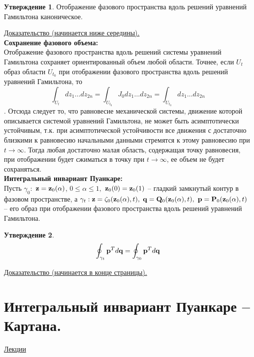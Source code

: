 \documentclass[specialist, subf, href, colorlinks=true, 12pt, times, mtpro, final]{disser}
\theoremstyle{definition}
\newtheorem{state}{Утверждение}[section]
\begin{document}
    \begin{state}
    	Отображение фазового пространства вдоль решений уравнений Гамильтона каноническое.
    \end{state}
    \hyperlink{lects.39}{Доказательство (начинается ниже середины).}\\

	\textbf{Сохранение фазового объема:}\\
	Отображение фазового пространства вдоль решений системы уравнений Гамильтона сохраняет ориентированный объем любой области. Точнее, если $U_t$ образ области $U_{t_0}$ при отображении фазового пространства вдоль решений уравнений Гамильтона, то
	$$\int_{U_t} dz_1 \dots dz_{2n} = \int_{U_{t_0}} J_0 dz_1 \dots dz_{2n} = \int_{U_{t_0}} dz_1 \dots dz_{2n}$$.
	Отсюда следует то, что равновесие механической системы, движение которой описывается системой уравнений Гамильтона, не может быть асимптотически устойчивым, т.к. при асимптотической устойчивости все движения с достаточно близкими к равновесию начальными данными стремятся к этому равновесию при $t \to \infty$. Тогда любая достаточно малая область, содержащая точку равновесия, при отображении будет сжиматься в точку при $t \to \infty$, ее объем не будет сохраняться.\\
	
	\textbf{Интегральный инвариант Пуанкаре:}\\
	Пусть $\gamma_0:$ $\mathbf{z} = \mathbf{z}_0(\alpha)$, $0\leq\alpha \leq 1,$ $\mathbf{z}_0(0) = \mathbf{z}_0(1)$ -- гладкий замкнутый контур в фазовом пространстве, а $\gamma_t: \mathbf{z} = \zeta_0(\mathbf{z}_0(\alpha), t),$ $\mathbf{q} = \mathbf{Q}_0(\mathbf{z}_0(\alpha), t),$  $\mathbf{p} = \mathbf{P}_0(\mathbf{z}_0(\alpha), t)$ -- его образ при отображении фазового пространства вдоль решений уравнений Гамильтона.\\
	\begin{state}
		$$\oint_{\gamma_t} \mathbf{p}^T d\mathbf{q} = \oint_{\gamma_0} \mathbf{p}^T d\mathbf{q}$$
	\end{state}
	\hyperlink{lects.40}{Доказательство (начинается в конце страницы).}\\
	
    \section{Интегральный инвариант Пуанкаре – Картана.}
     \label{23}
    \hyperlink {lects.42}{Лекции} \\
    
\end{document}
